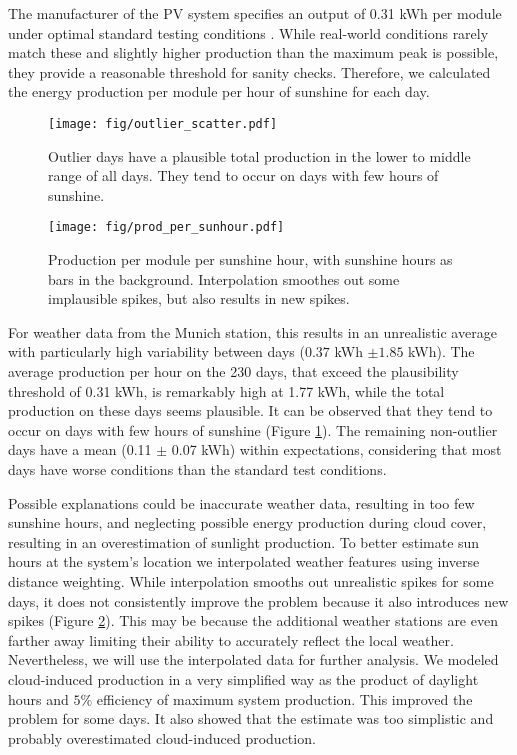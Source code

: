 \documentclass{article}
\begin{document}
The manufacturer of the PV system specifies an output of 0.31 kWh per module under optimal standard testing conditions \citep{MonoSol}. While real-world conditions rarely match these and slightly higher production than the maximum peak is possible, they provide a reasonable threshold for sanity checks. Therefore, we calculated the energy production per module per hour of sunshine for each day.

\begin{figure}[H]
	\texttt{[image: fig/outlier\_scatter.pdf]}
	\caption{Outlier days have a plausible total production in the lower to middle range of all days. They tend to occur on days with few hours of sunshine.}\label{fig:outlier_scatter}
\end{figure}
\begin{figure}[H]
	\texttt{[image: fig/prod\_per\_sunhour.pdf]}
	\caption{Production per module per sunshine hour, with sunshine hours as bars in the background. Interpolation smoothes out some implausible spikes, but also results in new spikes.}\label{fig:prod_per_hour}
\end{figure}

For weather data from the Munich station, this results in an unrealistic average with particularly high variability between days ($0.37$ kWh $\pm 1.85$ kWh). The average production per hour on the 230 days, that exceed the plausibility threshold of 0.31 kWh, is remarkably high at 1.77 kWh, while the total production on these days seems plausible. It can be observed that they tend to occur on days with few hours of sunshine (Figure \ref{fig:outlier_scatter}).  The remaining non-outlier days have a mean (0.11 $\pm$ 0.07 kWh) within expectations, considering that most days have worse conditions than the standard test conditions. 

Possible explanations could be inaccurate weather data, resulting in too few sunshine hours, and neglecting possible energy production during cloud cover, resulting in an overestimation of sunlight production. To better estimate sun hours at the system's location we interpolated weather features using inverse distance weighting. While interpolation smooths out unrealistic spikes for some days, it does not consistently improve the problem because it also introduces new spikes (Figure \ref{fig:prod_per_hour}). This may be because the additional weather stations are even farther away limiting their ability to accurately reflect the local weather. Nevertheless, we will use the interpolated data for further analysis. We modeled cloud-induced production in a very simplified way as the product of daylight hours and $5\%$ efficiency of maximum system production. This improved the problem for some days. It also showed that the estimate was too simplistic and probably overestimated cloud-induced production.
\end{document}

